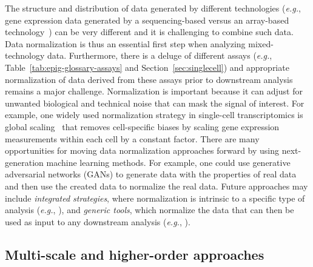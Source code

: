 \documentclass[5p]{elsarticle}
\newcommand{\eg}{\emph{e.g.}\xspace}
\newcommand{\rev}[1]{{\color{black}#1}}
\begin{document}
The structure and \rev{distribution} of data generated by different technologies (\eg, gene expression data generated by a sequen\-cing-based \rev{versus} an array-based technology~\cite{Wang2014concordance}) can be very different and it is challenging to combine such data. Data normalization is thus an essential first step when analyzing mixed-technology data. Furthermore, there is a deluge of \rev{different assays} (\eg, Table~\ref{tab:epig-glossary-assays} and Section~\ref{sec:singlecell}) and \rev{appropriate normalization of data} derived from \rev{these assays} prior to downstream \rev{analysis} remains a major challenge. Normalization is \rev{important because} it can adjust for unwanted biological and technical noise that can mask the signal of interest. For example, one widely used normalization strategy in single-cell transcriptomics is glo\-bal scaling~\cite{Vallejos2017normalizing} that removes cell-specific biases by scaling gene expression measurements within each cell by a constant factor. There are many opportunities for moving data normalization approaches forward by using next-generation machine learning methods. For example, one could use generative adversarial networks (GANs) to generate data with the properties of real data and then use the created data to normalize the real data. Future approaches may include {\em integrated strategies}, where normalization is intrinsic to a specific type of analysis (\eg, \cite{Hiranuma2018aicontrol}), and {\em generic tools}, which normalize the data that can then be used as input to any downstream analysis (\eg, \cite{Bacher2017scnorm,Taroni2017cross,Wang2018network}).

\subsection{Multi-scale and higher-order approaches}
\end{document}
